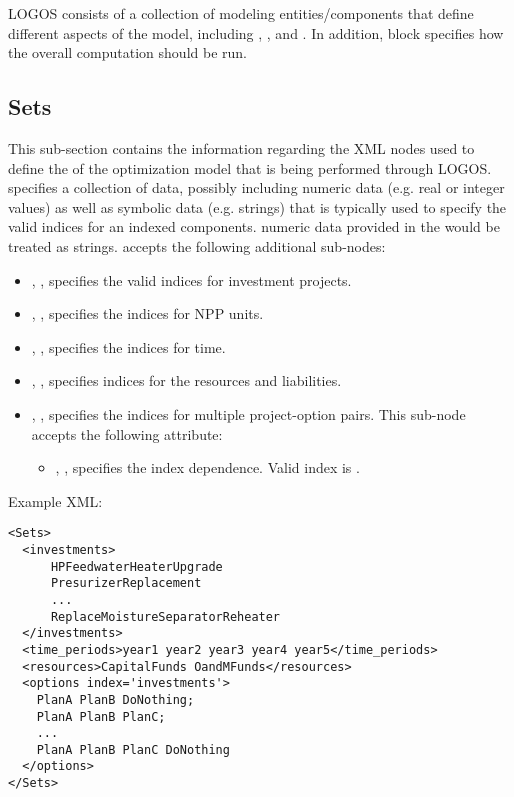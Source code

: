 LOGOS consists of a collection of modeling entities/components that define different
aspects of the model, including , ,
 and . In addition, 
block specifies how the overall computation should be run.

%
\subsection{Sets}
\label{subsec:Sets}

This sub-section contains the information regarding the XML nodes used to define the
 of the optimization model that is being performed through LOGOS.
 specifies a collection of data, possibly including
numeric data (e.g. real or integer values) as well as symbolic data (e.g. strings)
that is typically used to specify the valid indices for an indexed components.
\nb numeric data provided in the  would be treated as strings.
 accepts the following additional sub-nodes:
\begin{itemize}
  \item {}, , specifies
  the valid indices for investment projects.
  \item {}, ,
  specifies the indices for NPP units.
  \item {}, ,
  specifies the indices for time.
  \item {}, ,
  specifies indices for the resources and liabilities.
  \item {}, ,
  specifies the indices for multiple project-option pairs.
  This sub-node accepts the following attribute:
  \begin{itemize}
    \item {}, , specifies the index dependence.
    Valid index is .
  \end{itemize}
\end{itemize}

Example XML:
\begin{lstlisting}[style=XML]
<Sets>
  <investments>
      HPFeedwaterHeaterUpgrade
      PresurizerReplacement
      ...
      ReplaceMoistureSeparatorReheater
  </investments>
  <time_periods>year1 year2 year3 year4 year5</time_periods>
  <resources>CapitalFunds OandMFunds</resources>
  <options index='investments'>
    PlanA PlanB DoNothing;
    PlanA PlanB PlanC;
    ...
    PlanA PlanB PlanC DoNothing
  </options>
</Sets>
\end{lstlisting}


